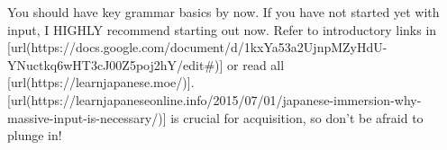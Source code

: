 You should have key grammar basics by now. If you have not started yet with input, I HIGHLY recommend starting out now. Refer to introductory links in [url(https://docs.google.com/document/d/1kxYa53a2UjnpMZyHdU-YNuctkq6wHT3cJ00Z5poj2hY/edit\#)] or read all [url(https://learnjapanese.moe/)]. [url(https://learnjapaneseonline.info/2015/07/01/japanese-immersion-why-massive-input-is-necessary/)] is crucial for acquisition, so don't be afraid to plunge in!

\stopsectionlevel

\stopsectionlevel
